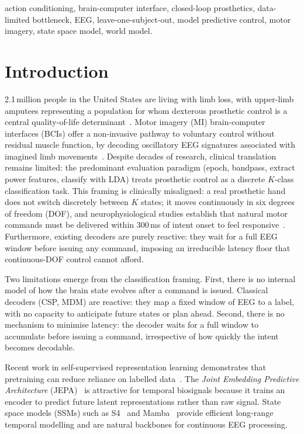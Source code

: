 \documentclass[journal]{IEEEtran}
\begin{document}
\begin{IEEEkeywords}
action conditioning, brain-computer interface, closed-loop prosthetics, data-limited bottleneck, EEG, leave-one-subject-out, model predictive control, motor imagery, state space model, world model.
\end{IEEEkeywords}


\section{Introduction}
\label{sec:intro}

 2.1\,million people in the United States are living with limb loss, with upper-limb amputees representing a population for whom dexterous prosthetic control is a central quality-of-life determinant~\cite{shenoy2013combining}.
Motor imagery (MI) brain-computer interfaces (BCIs) offer a non-invasive pathway to voluntary control without residual muscle function, by decoding oscillatory EEG signatures associated with imagined limb movements~\cite{pfurtscheller2001motor}.
Despite decades of research, clinical translation remains limited: the predominant evaluation paradigm (epoch, bandpass, extract power features, classify with LDA) treats prosthetic control as a discrete $K$-class classification task.
This framing is clinically misaligned: a real prosthetic hand does not switch discretely between $K$ states; it moves continuously in six degrees of freedom (DOF), and neurophysiological studies establish that natural motor commands must be delivered within 300\,ms of intent onset to feel responsive~\cite{shenoy2013combining}.
Furthermore, existing decoders are purely reactive: they wait for a full EEG window before issuing any command, imposing an irreducible latency floor that continuous-DOF control cannot afford.

Two limitations emerge from the classification framing.
First, there is no internal model of how the brain state evolves after a command is issued.
Classical decoders (CSP, MDM) are reactive: they map a fixed window of EEG to a label, with no capacity to anticipate future states or plan ahead.
Second, there is no mechanism to minimise latency: the decoder waits for a full window to accumulate before issuing a command, irrespective of how quickly the intent becomes decodable.

Recent work in self-supervised representation learning demonstrates that pretraining can reduce reliance on labelled data~\cite{baevski2022data2vec,zhang2022mae}.
The \emph{Joint Embedding Predictive Architecture} (JEPA)~\cite{lecun2022jepa} is attractive for temporal biosignals because it trains an encoder to predict future latent representations rather than raw signal.
State space models (SSMs) such as S4~\cite{gu2022efficiently} and Mamba~\cite{gu2023mamba} provide efficient long-range temporal modelling and are natural backbones for continuous EEG processing.
\end{document}
